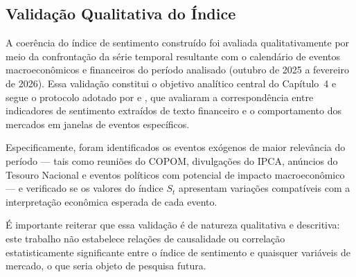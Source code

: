 \subsection{Validação Qualitativa do Índice}
\label{subsec:validacao_qualitativa}

A coerência do índice de sentimento construído foi avaliada qualitativamente por meio da confrontação da série temporal resultante com o calendário de eventos macroeconômicos e financeiros do período analisado (outubro de 2025 a fevereiro de 2026). Essa validação constitui o objetivo analítico central do Capítulo~4 e segue o protocolo adotado por  e , que avaliaram a correspondência entre indicadores de sentimento extraídos de texto financeiro e o comportamento dos mercados em janelas de eventos específicos.

Especificamente, foram identificados os eventos exógenos de maior relevância do período — tais como reuniões do COPOM, divulgações do IPCA, anúncios do Tesouro Nacional e eventos políticos com potencial de impacto macroeconômico — e verificado se os valores do índice $S_t$ apresentam variações compatíveis com a interpretação econômica esperada de cada evento.

É importante reiterar que essa validação é de natureza qualitativa e descritiva: este trabalho não estabelece relações de causalidade ou correlação estatisticamente significante entre o índice de sentimento e quaisquer variáveis de mercado, o que seria objeto de pesquisa futura.
